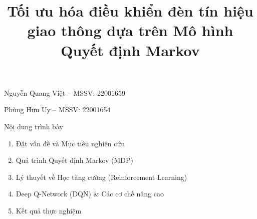 \documentclass{beamer}
\title{Tối ưu hóa điều khiển đèn tín hiệu giao thông dựa trên Mô hình Quyết định Markov}
\date{}
\begin{document}
\begin{frame}
\titlepage
\vspace{-3cm}
    \begin{center}
        \item Nguyễn Quang Việt – MSSV: 22001659
        \item Phùng Hữu Uy – MSSV: 22001654
    \end{center}
\end{frame}

\begin{frame}{Nội dung trình bày}
    \begin{enumerate}
        \item Đặt vấn đề và Mục tiêu nghiên cứu
        \item Quá trình Quyết định Markov (MDP)
        \item Lý thuyết về Học tăng cường (Reinforcement Learning)
        \item Deep Q-Network (DQN) \& Các cơ chế nâng cao
        \item Kết quả thực nghiệm
    \end{enumerate}
\end{frame}






\end{document}
